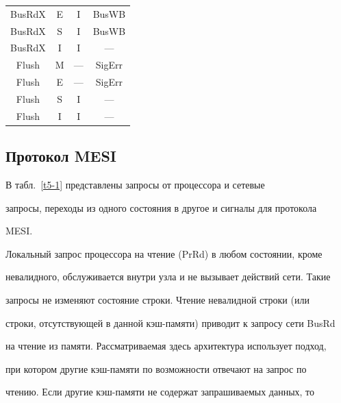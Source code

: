 \begin{table}[b]
\begin{center}
\begin{tabular}{|c|c|c|c|}
BusRdX&E&I&BusWB\\


BusRdX&S&I&BusWB\\


BusRdX


&I&I&---\\


Flush&M&---&SigErr\\


Flush&E&---&SigErr\\


Flush&S&I&---\\


Flush&I&I&---\\


\hline


\end{tabular}


\end{center}


\end{table}








\subsection{Протокол MESI} %





      В табл.~\ref{t5-1} представлены запросы от процессора и сетевые 


запросы, переходы из одного состояния в другое и сигналы для протокола 


MESI.





Локальный запрос процессора на чтение (PrRd) в любом состоянии, кроме 


невалидного, обслуживается внутри узла и не вызывает действий сети. Такие 


запросы не изменяют состояние строки. Чтение невалидной строки (или 


строки, отсутствующей в данной кэш-памяти) приводит к запросу сети BusRd 


на чтение из памяти. Рассматриваемая здесь архитектура использует подход, 


при котором другие кэш-памяти по возможности отвечают на запрос по 


чтению. Если другие кэш-памяти не содержат запрашиваемых данных, то 


